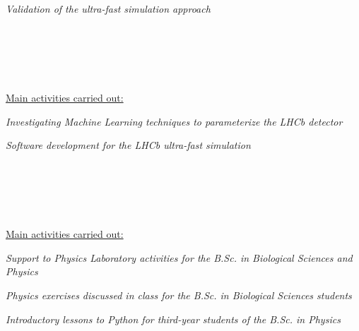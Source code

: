 \begin{cvcontent}
{\begin{itemize*}[label=\textcolor{iconcolor}{\textbullet}]
    \item \emph{Validation of the ultra-fast simulation approach}
  \end{itemize*}}
  \\ [6mm]
  \\ [0.5mm]
  \\ [1.5mm]
  \\ [1.5mm]
  {\normalsize \color{maincolor} \ul{Main activities carried out:}\\ [1.5mm]
  \begin{itemize*}[label=\textcolor{iconcolor}{\textbullet}]
    \item \emph{Investigating Machine Learning techniques to 
      parameterize the LHCb detector}\\ [0.5mm]
    \item \emph{Software development for the LHCb ultra-fast simulation}
  \end{itemize*}}
  \\ [6mm]
  \\ [0.5mm]
  \\ [1.5mm]
  \\ [1.5mm]
  {\normalsize \color{maincolor} \ul{Main activities carried out:}\\ [1.5mm]
  \begin{itemize*}[label=\textcolor{iconcolor}{\textbullet}]
    \item \emph{Support to Physics Laboratory activities for 
      the B.Sc. in Biological Sciences and Physics}\\ [0.5mm]
    \item \emph{Physics exercises discussed in class for the 
      B.Sc. in Biological Sciences students}\\ [0.5mm]
    \item \emph{Introductory lessons to Python for third-year 
      students of the B.Sc. in Physics}
  \end{itemize*}}
  \newpage\noindent

\end{cvcontent}
